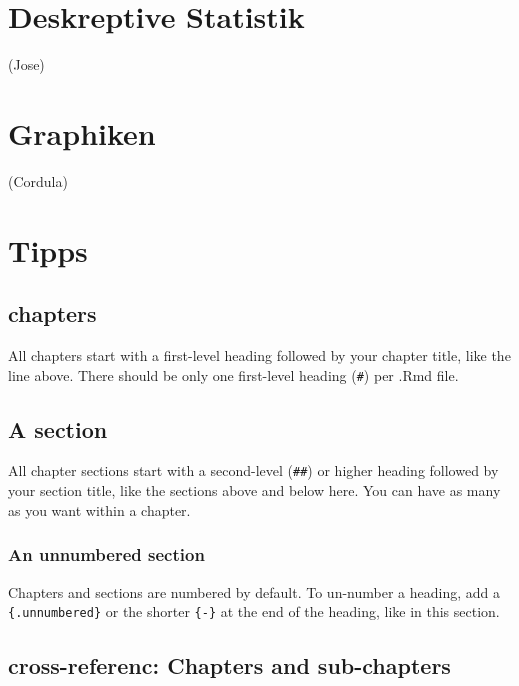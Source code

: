 \documentclass[
]{book}
\theoremstyle{definition}
\theoremstyle{definition}
\theoremstyle{definition}
\theoremstyle{definition}
\theoremstyle{remark}
\begin{document}
\hypertarget{deskreptive-statistik}{%
\chapter{Deskreptive Statistik}\label{deskreptive-statistik}}

(Jose)

\hypertarget{graphiken}{%
\chapter{Graphiken}\label{graphiken}}

(Cordula)

\hypertarget{tipps}{%
\chapter{Tipps}\label{tipps}}

\hypertarget{chapters}{%
\section{chapters}\label{chapters}}

All chapters start with a first-level heading followed by your chapter title, like the line above. There should be only one first-level heading (\texttt{\#}) per .Rmd file.

\hypertarget{a-section}{%
\section{A section}\label{a-section}}

All chapter sections start with a second-level (\texttt{\#\#}) or higher heading followed by your section title, like the sections above and below here. You can have as many as you want within a chapter.

\hypertarget{an-unnumbered-section}{%
\subsection*{An unnumbered section}\label{an-unnumbered-section}}

Chapters and sections are numbered by default. To un-number a heading, add a \texttt{\{.unnumbered\}} or the shorter \texttt{\{-\}} at the end of the heading, like in this section.

\hypertarget{cross-referenc-chapters-and-sub-chapters}{%
\section{cross-referenc: Chapters and sub-chapters}\label{cross-referenc-chapters-and-sub-chapters}}
\end{document}
